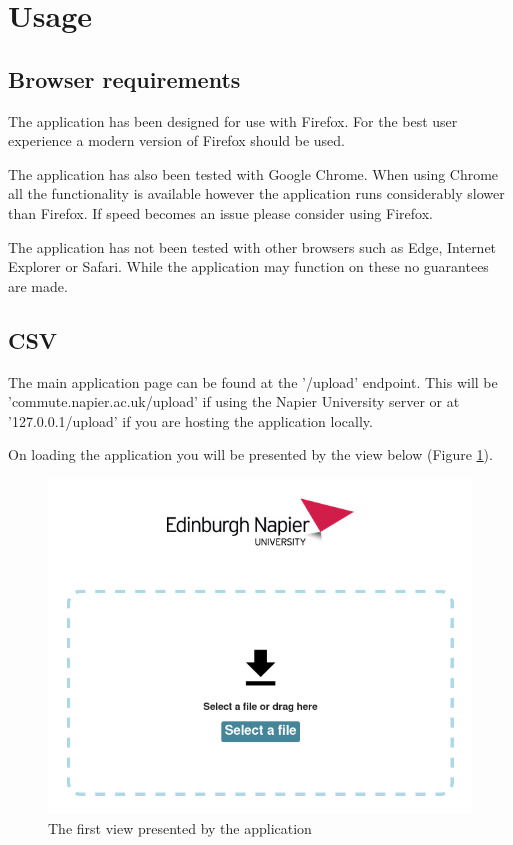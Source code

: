 \section{Usage}

\subsection{Browser requirements}

The application has been designed for use with Firefox.  For the best user experience a modern version of Firefox should be used.

The application has also been tested with Google Chrome.  When using Chrome all the functionality is available however the application runs considerably slower than Firefox.  If speed becomes an issue please consider using Firefox.

The application has not been tested with other browsers such as Edge, Internet Explorer or Safari.  While the application may function on these no guarantees are made.

\subsection{CSV}

The main application page can be found at the '/upload' endpoint.  This will be 'commute.napier.ac.uk/upload' if using the Napier University server or at '127.0.0.1/upload' if you are hosting the application locally.

On loading the application you will be presented by the view below (Figure \ref{img:csv-upload-page-layout}).

\begin{figure}[h]
	\includegraphics[width=\linewidth]{images/csv-upload-page-layout.png}
	\caption{The first view presented by the application}
	\label{img:csv-upload-page-layout}
\end{figure}

